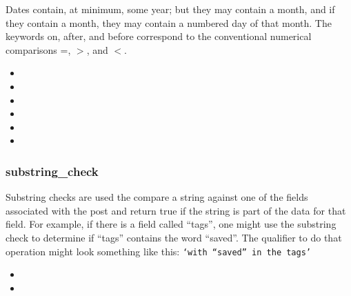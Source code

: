 Dates contain, at minimum, some year; but they may contain a month, and if they contain a month, they may contain a numbered day of
that month. The keywords on, after, and before correspond to the conventional numerical comparisons =, $>$, and $<$.
\begin{itemize}[leftmargin=2in]
    \item[\nonterminal{qualifier}] \bnf{:} 
    \item[\nonterminal{date\_check}] \bnf{:}  \bnf{(} \bnf{|}  \bnf{|} \bnf{)}
    \item[\nonterminal{date}] \bnf{:} \bnf{(}     
    \item[\nonterminal{year}] \bnf{:} 
    \item[\nonterminal{month}] \bnf{:}  \bnf{|}  \bnf{|}  \bnf{|}  \bnf{|}  \bnf{|}  \bnf{|}  \bnf{|}  \bnf{|}  \bnf{|}  \bnf{|}  \bnf{|} 
    \item[\nonterminal{day}] \bnf{:} \bnf{[0-3]} 
\end{itemize}

\subsubsection{substring\_check}
Substring checks are used the compare a string against one of the fields associated with the post and return true if the string is part
of the data for that field. For example, if there is a field called “tags”, one might use the substring check to determine if “tags”
contains the word “saved”. The qualifier to do that operation might look something like this: \texttt{‘with “saved” in the tags’}
\begin{itemize}[leftmargin=2in]
    \item[\nonterminal{qualifier}] \bnf{:} 
    \item[\nonterminal{substring\_check}] \bnf{:} 
\end{itemize}

